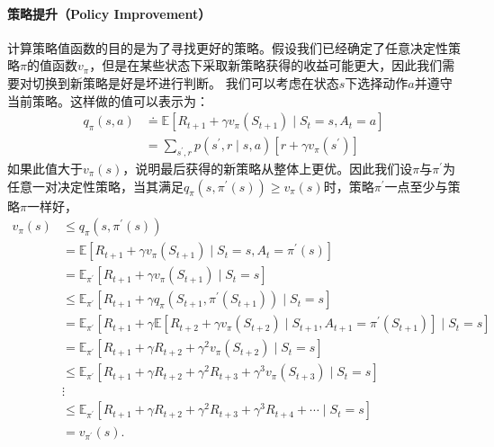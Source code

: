 \paragraph{策略提升（Policy Improvement）}
计算策略值函数的目的是为了寻找更好的策略。假设我们已经确定了任意决定性策略$\pi$的值函数$v_{\pi}$，但是在某些状态下采取新策略获得的收益可能更大，因此我们需要对切换到新策略是好是坏进行判断。
我们可以考虑在状态$s$下选择动作$a$并遵守当前策略。这样做的值可以表示为：
\begin{equation}
  \begin{aligned}
  q_{\pi}(s, a) & \doteq \mathbb{E}\left[R_{t+1}+\gamma v_{\pi}\left(S_{t+1}\right) \mid S_{t}=s, A_{t}=a\right] \\
  &=\sum_{s^{\prime}, r} p\left(s^{\prime}, r \mid s, a\right)\left[r+\gamma v_{\pi}\left(s^{\prime}\right)\right]
  \end{aligned}
\end{equation}
如果此值大于$v_{\pi}(s)$，说明最后获得的新策略从整体上更优。因此我们设$\pi$与$\pi^{'}$为任意一对决定性策略，当其满足$q_{\pi}\left(s, \pi^{\prime}(s)\right) \geq v_{\pi}(s)$时，策略$\pi^{'}$一点至少与策略$\pi$一样好，
\begin{equation}
  \begin{aligned}
  v_{\pi}(s) & \leq q_{\pi}\left(s, \pi^{\prime}(s)\right) \\
  &=\mathbb{E}\left[R_{t+1}+\gamma v_{\pi}\left(S_{t+1}\right) \mid S_{t}=s, A_{t}=\pi^{\prime}(s)\right] \\
  &=\mathbb{E}_{\pi^{\prime}}\left[R_{t+1}+\gamma v_{\pi}\left(S_{t+1}\right) \mid S_{t}=s\right] \\
  & \leq \mathbb{E}_{\pi^{\prime}}\left[R_{t+1}+\gamma q_{\pi}\left(S_{t+1}, \pi^{\prime}\left(S_{t+1}\right)\right) \mid S_{t}=s\right] \\
  &=\mathbb{E}_{\pi^{\prime}}\left[R_{t+1}+\gamma \mathbb{E}\left[R_{t+2}+\gamma v_{\pi}\left(S_{t+2}\right) \mid S_{t+1}, A_{t+1}=\pi^{\prime}\left(S_{t+1}\right)\right] \mid S_{t}=s\right] \\
  &=\mathbb{E}_{\pi^{\prime}}\left[R_{t+1}+\gamma R_{t+2}+\gamma^{2} v_{\pi}\left(S_{t+2}\right) \mid S_{t}=s\right] \\
  & \leq \mathbb{E}_{\pi^{\prime}}\left[R_{t+1}+\gamma R_{t+2}+\gamma^{2} R_{t+3}+\gamma^{3} v_{\pi}\left(S_{t+3}\right) \mid S_{t}=s\right] \\
  & \vdots \\
  & \leq \mathbb{E}_{\pi^{\prime}}\left[R_{t+1}+\gamma R_{t+2}+\gamma^{2} R_{t+3}+\gamma^{3} R_{t+4}+\cdots \mid S_{t}=s\right] \\
  &=v_{\pi^{\prime}}(s) .
  \end{aligned}
\end{equation}
